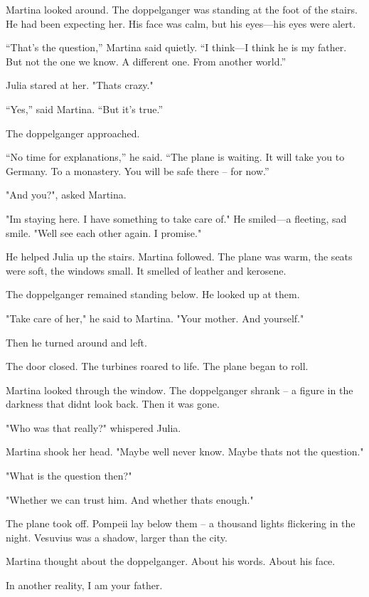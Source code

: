 \documentclass[
]{article}
\begin{document}
Martina looked around. The doppelganger was standing at the foot of the stairs. He had been expecting her. His face was calm, but his eyes---his eyes were alert.

``That's the question,'' Martina said quietly. ``I think---I think he is my father. But not the one we know. A different one. From another world.''

Julia stared at her. "That\textquotesingle s crazy."

``Yes,'' said Martina. ``But it's true.''

The doppelganger approached.

``No time for explanations,'' he said. ``The plane is waiting. It will take you to Germany. To a monastery. You will be safe there -- for now.''

"And you?", asked Martina.

"I\textquotesingle m staying here. I have something to take care of." He smiled---a fleeting, sad smile. "We\textquotesingle ll see each other again. I promise."

He helped Julia up the stairs. Martina followed. The plane was warm, the seats were soft, the windows small. It smelled of leather and kerosene.

The doppelganger remained standing below. He looked up at them.

"Take care of her," he said to Martina. "Your mother. And yourself."

Then he turned around and left.

The door closed. The turbines roared to life. The plane began to roll.

Martina looked through the window. The doppelganger shrank -- a figure in the darkness that didn\textquotesingle t look back. Then it was gone.

"Who was that really?" whispered Julia.

Martina shook her head. "Maybe we\textquotesingle ll never know. Maybe that\textquotesingle s not the question."

"What is the question then?"

"Whether we can trust him. And whether that\textquotesingle s enough."

The plane took off. Pompeii lay below them -- a thousand lights flickering in the night. Vesuvius was a shadow, larger than the city.

Martina thought about the doppelganger. About his words. About his face.

In another reality, I am your father.
\end{document}
